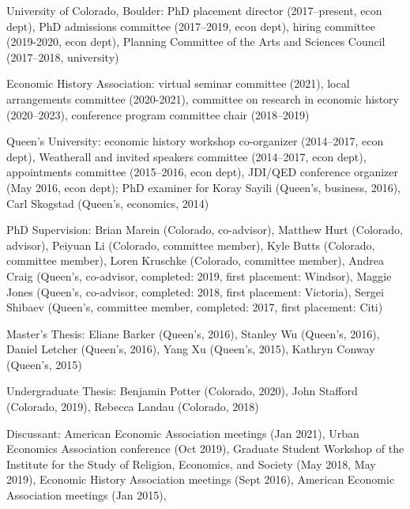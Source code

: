 \documentclass[11pt,letterpaper]{article}
\begin{document}
\begin{description}[leftmargin=0in,itemsep=.25em,itemindent=0in]

\item University of Colorado, Boulder: PhD placement director (2017--present, econ dept), PhD admissions committee (2017--2019, econ dept), hiring committee (2019-2020, econ dept), Planning Committee of the Arts and Sciences Council (2017--2018, university) 

\item Economic History Association: virtual seminar committee (2021), local arrangements committee (2020-2021), committee on research in economic history (2020--2023), conference program committee chair (2018--2019)

\item Queen's University: economic history workshop co-organizer (2014--2017, econ dept), Weatherall and invited speakers committee (2014--2017, econ dept), appointments committee (2015--2016, econ dept), JDI/QED conference organizer (May 2016, econ dept); PhD examiner for Koray Sayili (Queen's, business, 2016), Carl Skogstad (Queen's, economics, 2014)


\item PhD Supervision: Brian Marein (Colorado, co-advisor), Matthew Hurt (Colorado, advisor), Peiyuan Li (Colorado, committee member), Kyle Butts (Colorado, committee member), Loren Kruschke (Colorado, committee member),  Andrea Craig (Queen's, co-advisor, completed: 2019, first placement: Windsor), Maggie Jones (Queen's, co-advisor, completed: 2018, first placement:  Victoria), Sergei Shibaev (Queen's, committee member, completed: 2017, first placement: Citi)

\item Master's Thesis: Eliane Barker (Queen's, 2016),  Stanley Wu (Queen's, 2016), Daniel Letcher (Queen's, 2016), Yang Xu (Queen's, 2015), Kathryn Conway (Queen's, 2015)

\item Undergraduate Thesis: Benjamin Potter (Colorado, 2020), John Stafford (Colorado, 2019), Rebecca Landau (Colorado, 2018) %

\item Discussant: American Economic Association meetings (Jan 2021), Urban Economics Association conference (Oct 2019), Graduate Student Workshop of the Institute for the Study of Religion, Economics, and Society (May 2018, May 2019), Economic History Association meetings (Sept 2016), American Economic Association meetings (Jan 2015),


\end{description}
\end{document}

